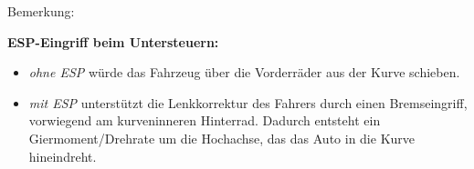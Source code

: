 Bemerkung:

\textbf{ESP-Eingriff beim Untersteuern:}

\begin{itemize}
\item
  \emph{ohne ESP} würde das Fahrzeug über die Vorderräder aus der Kurve
  schieben.
\item
  \emph{mit ESP} unterstützt die Lenkkorrektur des Fahrers durch einen
  Bremseingriff, vorwiegend am kurveninneren Hinterrad. Dadurch entsteht
  ein Giermoment/Drehrate um die Hochachse, das das Auto in die Kurve
  hineindreht.
\end{itemize}
